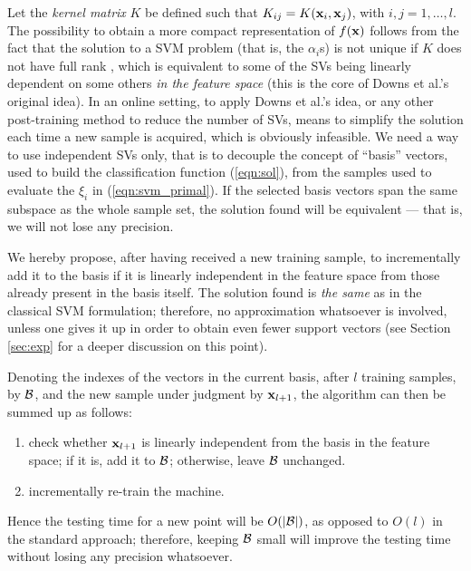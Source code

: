 Let the \emph{kernel matrix} $K$ be defined such that $K_{ij} =
K(\mathbf{x}_i,\mathbf{x}_j)$, with $i,j=1,\ldots,l$. The possibility to obtain a
more compact representation of $f(\mathbf{x})$ follows from the fact that the
solution to a SVM problem (that is, the $\alpha_i$s) is not unique if
$K$ does not have full rank \cite{Burges98}, which is equivalent to
some of the SVs being linearly dependent on some others \emph{in the
feature space} (this is the core of Downs et al.'s \cite{DownsGM01}
original idea). In an online setting, to apply Downs et al.'s idea, or
any other post-training method to reduce the number of SVs, means to
simplify the solution each time a new sample is acquired, which is
obviously infeasible. We need a way to use independent SVs only, that
is to decouple the concept of ``basis'' vectors, used to build the
classification function (\ref{eqn:sol}), from the samples used to
evaluate the $\xi_i$ in (\ref{eqn:svm_primal}). If the selected basis
vectors span the same subspace as the whole sample set, the solution
found will be equivalent --- that is, we will not lose any precision.

We hereby propose, after having received a new training sample, to
incrementally add it to the basis if it is linearly independent in the
feature space from those already present in the basis itself. The
solution found is \emph{the same} as in the classical SVM formulation;
therefore, no approximation whatsoever is involved, unless one gives
it up in order to obtain even fewer support vectors (see Section
\ref{sec:exp} for a deeper discussion on this point).

Denoting the indexes of the vectors in the current basis, after $l$
training samples, by $\mathcal{B}$, and the new sample under judgment by
$\mathbf{x}_{l+1}$, the algorithm can then be summed up as follows:

\begin{enumerate}

  \item check whether $\mathbf{x}_{l+1}$ is linearly independent from the
        basis in the feature space; if it is, add it to $\mathcal{B}$;
        otherwise, leave $\mathcal{B}$ unchanged.

  \item incrementally re-train the machine.

\end{enumerate}

Hence the testing time for a new point will be $O(|\mathcal{B}|)$, as opposed
to $O(l)$ in the standard approach; therefore, keeping $\mathcal{B}$ small will
improve the testing time without losing any precision whatsoever.


